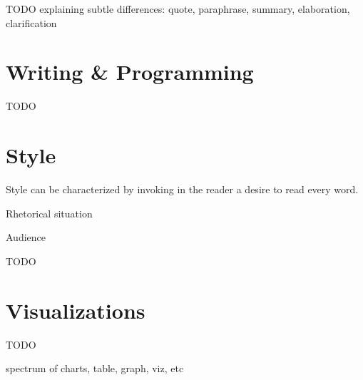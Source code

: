 \documentclass[10pt,a4paper]{book}
\begin{document}
\color{BrickRed}TODO\color{black}
explaining subtle differences: quote, paraphrase, summary, elaboration, clarification


\chapter{Writing \& Programming}

\color{BrickRed}TODO\color{black}


\chapter{Style}\label{Style}


Style can be characterized by invoking in the reader a desire to read every word.

Rhetorical situation

Audience

\color{BrickRed}TODO\color{black}


\chapter{Visualizations}\label{Visualizations}

\color{BrickRed}TODO\color{black}

spectrum of charts, table, graph, viz, etc




\end{document}
